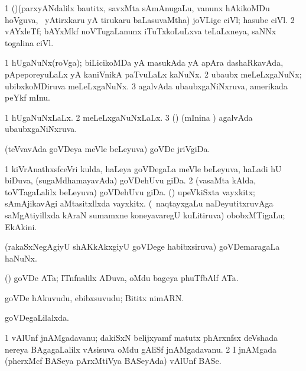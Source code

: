 {\bentry
{} 
\gl{\nA}
\bmng
\bnum
\num{1} (\pArxparx)(parxyANdalilx bautitx, savxMta sAmAnugaLu, \mo vanunx hAkikoMDu hoVguva, \kanmu\ yAtirxkaru yA tirukaru baLasuvaMtha) joVLige ciVl; hasube ciVl. 
\num{2} vAYxleTf; bAYxMkf noVTugaLanunx iTuTxkoLuLxva teLaLxneya, saNNx togalina ciVl. 
\enum
\emng
\eentry

\bentry
{} 
\gl{\nA}
\bmng
\bnum
\num{1} hUgaNuNx(roVga); biLicikoMDa yA masukAda yA apAra dashaRkavAda, pApeporeyuLaLx yA kaniVnikA paTvuLaLx kaNuNx. 
\num{2} ubaubx meLeLxgaNuNx; ubibxkoMDiruva meLeLxgaNuNx.
\num{3} agalvAda ubaubxgaNiNxruva, amerikada peYkf mInu. 
\enum
\emng
\eentry

\bentry
{} 
\gl{\gu}
\expl{}
\bmng
\bnum
\num{1} hUgaNuNxLaLx. 
\num{2} meLeLxgaNuNxLaLx. 
\num{3} (\ame) (mInina \vi) agalvAda ubaubxgaNiNxruva. 
\enum
\emng
\eentry

\bentry
{} 
\gl{\nA}
\expl{}
\bmng
(teVvavAda goVDeya meVle beLeyuva) goVDe jriVgiDa. 
\emng
\eentry

\bentry
{} 
\gl{\nA}
\expl{}
\bmng
\bnum
\num{1} kiVrAnathxsfceVri kulda, haLeya goVDegaLa meVle beLeyuva, haLadi hU biDuva, (sugaMdhamayavAda) goVDehUvu giDa. 
\num{2} (vasaMta kAlda, toVTagaLalilx beLeyuva) goVDehUvu giDa. 
 (\AmA) 
\banum
{} upeVkiSxta vayxkitx; sAmAjikavAgi aMtasitxllxda vayxkitx. 
 (\kanmu\ naqtayxgaLu naDeyutitxruvAga saMgAtiyillxda kAraN sumamxne koneyavaregU kuLitiruva) obobxMTigaLu; EkAkini. 
\eanum
\numie
\enum
\emng
\eentry

\bentry
{} 
\gl{\nA}
\expl{}
\bmng
(rakaSxNegAgiyU shAKkAkxgiyU goVDege habibxsiruva) goVDemaragaLa haNuNx. 
\emng
\eentry

\bentry
{} 
\gl{\nA}
\expl{}
\bmng
(\birx) goVDe ATa; ITnfnalilx ADuva, oMdu bageya phuTfbAlf ATa. 
\emng
\eentry

\bentry
{} 
\gl{\nA}
\bmng
goVDe hAkuvudu, ebibxsuvudu; Bititx nimARN. 
\emng
\eentry

\bentry
{} 
\gl{\nA}
\expl{}
\bmng
{} 
\emng
\eentry

\bentry
{} 
\gl{\gu}
\expl{}
\bmng
goVDegaLilalxda. 
\emng
\eentry

\bentry
{}  
\gl{\nA}
\expl{}
\bmng
\bnum
\num{1} vAlUnf jnAMgadavanu; dakiSxN belijxyamf matutx phArxnfsx deVshada nereya BAgagaLalilx vAsisuva oMdu gAliSf jnAMgadavanu. 
\num{2} I jnAMgada (pherxMcf BASeya pArxMtiVya BASeyAda) vAlUnf BASe. 
\enum
\emng
\eentry

}
